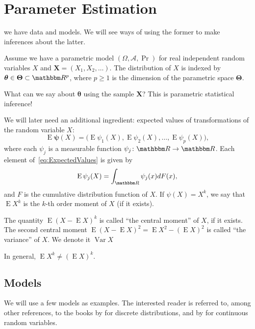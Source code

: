 \chapter{Parameter Estimation}\label{Chapter:ParameterEstimation}

 we have data and models.
We will see ways of using the former to make inferences about the latter.

Assume we have a parametric model $(\Omega, \mathcal A, \Pr)$ for real independent random  variables $X$ and $\bm X = (X_1,X_2,\dots)$.
The distribution of $X$ is indexed by $\bm \theta\in\bm \Theta\subset \mathbbm R^p$, where $p\geq 1$ is the dimension of the parametric space $\bm \Theta$.

What can we say about $\bm \theta$ using the sample $\bm X$?
This is parametric statistical inference!

We will later need an additional ingredient: expected values of transformations of the random variable $X$:
\begin{equation}
\operatorname{E}\bm\psi(X) = \big(
\operatorname{E}\psi_1(X), \operatorname{E}\psi_2(X), \dots, \operatorname{E}\psi_p(X)
\big),
\label{eq:ExpectedValues}
\end{equation}
where each $\psi_j$ is a measurable function $\psi_j\colon \mathbbm R\to\mathbbm R$.
Each element of~\eqref{eq:ExpectedValues} is given by
\begin{equation}
\operatorname{E}\psi_j(X) = 
	\int_{\mathbbm R} \psi_j(x) dF(x),
\end{equation}
and $F$ is the cumulative distribution function of $X$.
If $\psi(X)=X^k$, we say that $\operatorname{E}X^k$ is the $k$-th order moment of $X$ (if it exists).

The quantity $\operatorname{E}(X-\operatorname{E}X)^k$ is called ``the central moment'' of $X$, if it exists.
The second central moment $\operatorname{E}(X-\operatorname{E}X)^2 = \operatorname{E}X^2-(\operatorname{E}X)^2$ is called ``the variance'' of $X$.
We denote it $\operatorname{Var}X$

In general, $\operatorname{E}X^k\neq (\operatorname{E}X)^k$.

\section{Models}

We will use a few models as examples.
The interested reader is referred to, among other references, to the books by \citet{johnson_discrete} for discrete distributions, and by \citet{johnson_continuous2} for continuous random variables.

